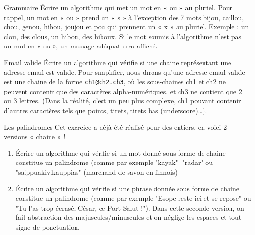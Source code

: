 \begin{Exercice}{Grammaire}
	Écrire un algorithme 
	qui met un mot en « ou » au pluriel. 
	Pour rappel, 
	un mot en « ou » prend un « s » à l'exception des 7 mots 
	bijou, caillou, chou, genou, hibou, joujou et pou qui prennent 
	un « x » au pluriel. 
	Exemple : un clou, des clous, un hibou, des hiboux. 
	Si le mot soumis à l'algorithme n'est pas un mot en « ou », 
	un message adéquat sera affiché.
\end{Exercice}



\begin{Exercice}{Email valide}
	Écrire un algorithme 
	qui vérifie si une chaine représentant une adresse email 
	est valide. 
	Pour simplifier, 
	nous dirons qu'une adresse email valide 
	est une chaine de la forme \verb|ch1@ch2.ch3|, 
	où les sous-chaines ch1 et ch2 ne peuvent contenir 
	que des caractères alpha-numériques, 
	et ch3 ne contient que 2 ou 3 lettres. 
	(Dans la réalité, c'est un peu plus complexe, 
	ch1 pouvant contenir d'autres caractères 
	tels que points, tirets, tirets bas (underscore)\dots).
\end{Exercice}

\begin{Exercice}{Les palindromes}
	Cet exercice a déjà été réalisé pour des entiers, 
	en voici 2 versions « chaine » ! 
	\begin{enumerate}[label=\alph*)]
	\item 
		Écrire un algorithme qui vérifie 
		si un mot donné sous forme de chaine 
		constitue un palindrome 
		(comme par exemple "kayak", "radar" ou "saippuakivikauppias" 
		(marchand de savon en finnois)
	\item
		Écrire un algorithme qui vérifie 
		si une phrase donnée sous forme de chaine constitue un palindrome 
		(comme par exemple "Esope reste ici et se repose" 
		ou "Tu l'as trop écrasé, César, ce Port-Salut !"). 
		Dans cette seconde version, 
		on fait abstraction des majuscules/minuscules 
		et on néglige les espaces et tout signe de ponctuation.
	\end{enumerate}
\end{Exercice}

